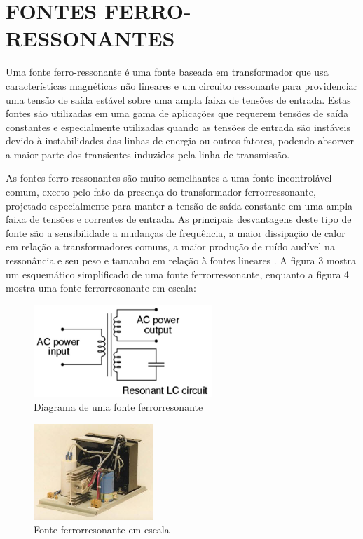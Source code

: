 \section{FONTES FERRO-RESSONANTES}
\label{sec:fontFerro}

Uma fonte ferro-ressonante é uma fonte baseada em transformador que usa características magnéticas não lineares e um circuito ressonante para providenciar uma tensão de saída estável sobre uma ampla faixa de tensões de entrada. Estas fontes são utilizadas em uma gama de aplicações que requerem tensões de saída constantes e especialmente utilizadas quando as tensões de entrada são instáveis devido à instabilidades das linhas de energia ou outros fatores, podendo absorver a maior parte dos transientes induzidos pela linha de transmissão. 

As fontes ferro-ressonantes são muito semelhantes a uma fonte incontrolável comum, exceto pelo fato da presença do transformador ferrorressonante, projetado especialmente para manter a tensão de saída constante em uma ampla faixa de tensões e correntes de entrada.  As principais desvantagens deste tipo de fonte são a sensibilidade a mudanças de frequência, a maior dissipação de calor em relação a transformadores comuns, a maior produção de ruído audível na ressonância e seu peso e tamanho em relação à fontes lineares \cite{PowerUk}. A figura 3 mostra um esquemático simplificado de uma fonte ferrorressonante, enquanto a figura 4 mostra uma fonte ferrorresonante em escala:


\begin{figure}[!htb]
    \centering
    \includegraphics[width=0.6\textwidth]{./dados/figuras/font-ferro}
    \caption{Diagrama de uma fonte ferrorresonante}
    \label{fig:figura-fontferro}
\end{figure}

\pagebreak

\begin{figure}[!htb]
    \centering
    \includegraphics[width=0.4\textwidth]{./dados/figuras/font-ferro-real}
    \caption{Fonte ferrorresonante em escala}
    \label{fig:figura-fontferro}
\end{figure}



